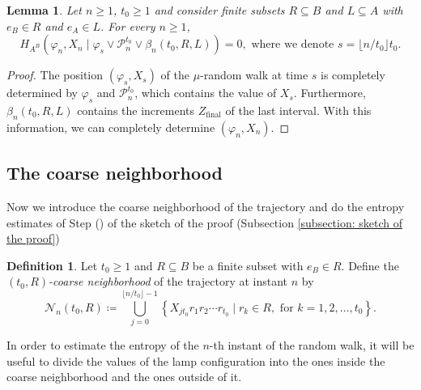 \documentclass[reqno,oneside,11pt]{amsart}
\theoremstyle{plain}
\newtheorem{lem}[thm]{Lemma}
\theoremstyle{definition}
\newtheorem{defn}[thm]{Definition} %
\begin{document}
\begin{lem}\label{lem: it suffices to guess the last multiple of t0} Let $n\ge 1$, $t_0\ge 1$ and consider finite subsets $R\subseteq B$ and $L\subseteq A$ with $e_B\in R$ and $e_A\in L$. For every $n\ge 1$,
	\begin{equation*}
		H_{A^B}\left(\varphi_n,X_n\mid \varphi_{s}\vee\mathcal{P}_n^{t_0}\vee\beta_n(t_0,R,L)\right)=0,	\text{ where we denote } s=\lfloor n/t_0\rfloor t_0.
	\end{equation*}
\end{lem}

\begin{proof}
	The position $(\varphi_s,X_s)$ of the $\mu$-random walk at time $s$ is completely determined by $\varphi_s$ and $\mathcal{P}_n^{t_0}$, which contains the value of $X_s$. Furthermore, $\beta_n(t_0,R,L)$ contains the increments $Z_{\mathrm{final}}$ of the last interval. With this information, we can completely determine $(\varphi_n,X_n)$.
\end{proof}

\subsection{The coarse neighborhood}
Now we introduce the coarse neighborhood of the trajectory and do the entropy estimates of Step () of the sketch of the proof (Subsection \ref{subsection: sketch of the proof})
\begin{defn}\label{def:neighborhood of coarse traj}
	Let $t_0\ge 1$ and $R\subseteq B$ be a finite subset with $e_B\in R$. Define the \emph{$(t_0,R)$-coarse neighborhood} of the trajectory at instant $n$ by
	\begin{equation*}
		\mathcal{N}_n(t_0,R)\coloneqq \bigcup_{j=0}^{\lfloor n/t_0 \rfloor -1} \left\{ X_{jt_0}r_1r_2\cdots r_{t_0}\mid r_k\in R, \text{ for }k=1,2,\ldots,t_0 \right \}.
	\end{equation*}
\end{defn}

In order to estimate the entropy of the $n$-th instant of the random walk, it will be useful to divide the values of the lamp configuration into the ones inside the coarse neighborhood and the ones outside of it.
\end{document}
